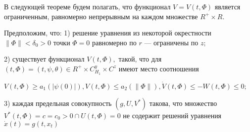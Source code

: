 		В следующей теореме будем полагать, что функционал $V = V(t, \varPhi)$ является ограниченным, равномерно непрерывным на каждом множестве $R^+ \times R.$ 
		
		\begin{theorem}\label{t-1.12} Предположим, что: 
			1) решение уравнения из некоторой окрестности ${\| \varPhi \| < \delta_0 > 0}$ точки $\varPhi = 0$ равномерно по $r$ --- ограничены по $z;$
			
			2) существует функционал $V(t, \varPhi), $ такой, что для $(t, \varPhi) = (t, \psi, \theta) \in R^+ \times C^y_{H_1} \times C^z$ имеют место соотношения
			
			$V(t, \varPhi) \ge a_1(| \psi(0) |), V(t, \varPhi) \le a_2(\| \varPhi \|), \dot V(t, \varPhi) \le - W(t, \varPhi) \le 0;$
			
			3) каждая предельная совокупность $(g, U, V^*)$ такова, что множество ${V^*(t, \varPhi) = c = c_0 > 0} \cap {U(t, \varPhi) = 0}$ не содержит решений уравнения $\dot x(t) = g(t, x_t)$
			
			
		\end{theorem}

